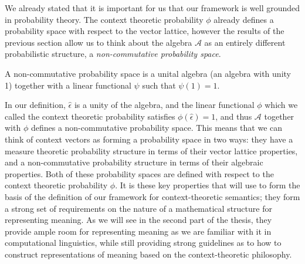 We already stated that it is important for us that our framework is well grounded in probability theory. The context theoretic probability $\phi$ already defines a probability space with respect to the vector lattice, however the results of the previous section allow us to think about the algebra $\mathcal{A}$ as an entirely different probabilistic structure, a \emph{non-commutative probability space}.
\begin{defn}
A non-commutative probability space is a unital algebra (an algebra with unity 1) together with a linear functional $\psi$ such that $\psi(1) = 1$.
\end{defn}
In our definition, $\hat{\epsilon}$ is a unity of the algebra, and the linear functional $\phi$ which we called the context theoretic probability satisfies $\phi(\hat{\epsilon}) = 1$, and thus $\mathcal{A}$ together with $\phi$ defines a non-commutative probability space. This means that we can think of context vectors as forming a probability space in two ways: they have a measure theoretic probability structure in terms of their vector lattice properties, and a non-commutative probability structure in terms of their algebraic properties. Both of these probability spaces are defined with respect to the context theoretic probability $\phi$. It is these key properties that will use to form the basis of the definition of our framework for context-theoretic semantics; they form a strong set of requirements on the nature of a mathematical structure for representing meaning. As we will see in the second part of the thesis, they provide ample room for representing meaning as we are familiar with it in computational linguistics, while still providing strong guidelines as to how to construct representations of meaning based on the context-theoretic philosophy.







